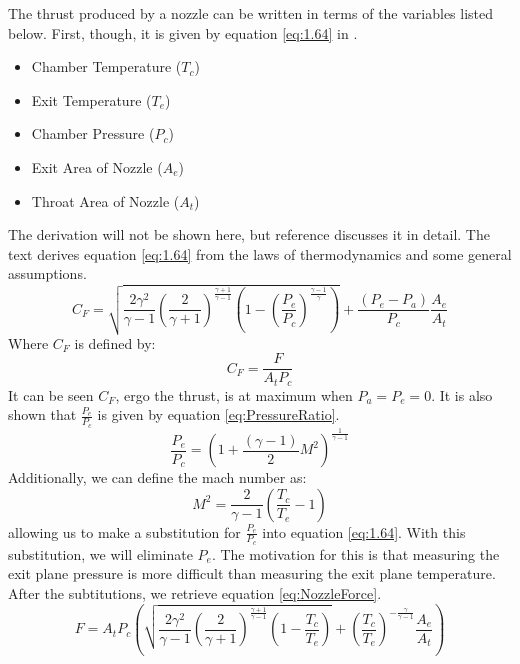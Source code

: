 The thrust produced by a nozzle can be written in terms of the variables listed below. First, though, it is given by equation \ref{eq:1.64} in \cite{RocketPropulsion}.
\begin{itemize}
\item Chamber Temperature ($T_c$)
\item Exit Temperature ($T_e$)
\item Chamber Pressure ($P_c$)
\item Exit Area of Nozzle ($A_e$)
\item Throat Area of Nozzle ($A_t$)
\end{itemize}
The derivation will not be shown here, but reference \cite{RocketPropulsion} discusses it in detail. The text derives equation \ref{eq:1.64} from the laws of thermodynamics and some general assumptions.
\begin{equation}\label{eq:1.64}
C_F= \sqrt{\frac{2\gamma^2}{\gamma-1}\left(\frac{2}{\gamma+1}\right)^{\frac{\gamma+1}{\gamma-1}}\left(1-\left(\frac{P_e}{P_c}\right)^{\frac{\gamma-1}{\gamma}}\right)}+\frac{\left(P_e-P_a\right)}{P_c}\frac{A_e}{A_t}
\end{equation}
Where $C_F$ is defined by:
\begin{equation}\label{eq:ThrustCoefficient}
C_F=\frac{F}{A_tP_c}
\end{equation}
It can be seen $C_F$, ergo the thrust, is at maximum when $P_a=P_e=0$. It is also shown that $\frac{P_e}{P_c}$ is given by equation \ref{eq:PressureRatio}.
\begin{equation}\label{eq:PressureRatio}
\frac{P_e}{P_c}=\left(1+\frac{(\gamma-1)}{2}M^2\right)^{\frac{1}{\gamma-1}}
\end{equation}
Additionally, we can define the mach number as:
\begin{equation}\label{eq:MachNumber}
M^2=\frac{2}{\gamma-1}\left(\frac{T_c}{T_e}-1\right)
\end{equation}
allowing us to make a substitution for $\frac{P_e}{P_c}$ into equation \ref{eq:1.64}. With this substitution, we will eliminate $P_e$. The motivation for this is that measuring the exit plane pressure is more difficult than measuring the exit plane temperature. After the subtitutions, we retrieve equation \ref{eq:NozzleForce}.
\begin{equation}\label{eq:NozzleForce}
F = A_t P_c \left(\sqrt{\frac{2\gamma^2}{\gamma-1}\left(\frac{2}{\gamma+1}\right)^{\frac{\gamma+1}{\gamma-1}}\left(1-\frac{T_c}{T_e}\right)}+\left(\frac{T_c}{T_e}\right)^{-\frac{\gamma}{\gamma-1}}\frac{A_e}{A_t}\right)
\end{equation}
